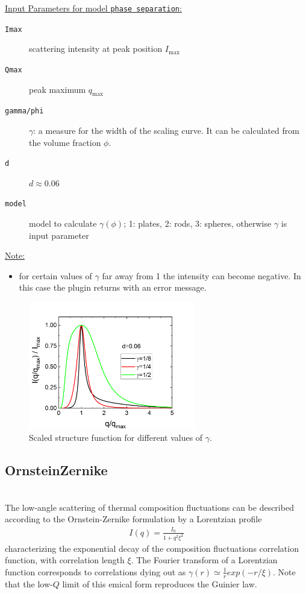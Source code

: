 \vspace{5mm}

\underline{Input Parameters for model \texttt{phase separation}:}\\
\begin{description}
\item[\texttt{Imax}] scattering intensity at peak position $I_\text{max}$
\item[\texttt{Qmax}] peak maximum $q_\text{max}$
\item[\texttt{gamma/phi}] $\gamma$: a measure for the width of the scaling curve. It can be calculated from the volume fraction $\phi$.
\item[\texttt{d}] $d \approx 0.06$
\item[\texttt{model}] model to calculate $\gamma(\phi)$; 1: plates, 2: rods, 3: spheres, otherwise $\gamma$ is input parameter
\end{description}

\underline{Note:}
\begin{itemize}
\item for certain values of $\gamma$ far away from 1 the intensity can become negative. In this case the plugin returns with an error message.
\end{itemize}



\begin{figure}[htb]
\begin{center}
\includegraphics[width=0.65\textwidth]{../images/form_factor/nonparticular/phase_separation.png}
\end{center}
\caption{Scaled structure function for different values of $\gamma$.} \label{fig:phaseseparationIQ}
\end{figure}

\clearpage
\subsection{OrnsteinZernike}
\label{sect:Zernike}
 ~\\
The low-angle scattering of thermal composition fluctuations can be
described according to the Ornstein-Zernike formulation by a
Lorentzian profile
\begin{align}
I(q) = \frac{I_0}{1+q^2\xi^2}
\end{align}
characterizing the exponential decay of the composition fluctuations
correlation function, with correlation length $\xi$. The Fourier
transform of a Lorentzian function corresponds to correlations dying
out as $\gamma(r) \simeq \frac{1}{r}exp(-r/\xi)$. Note that the
low-$Q$ limit of this emical form reproduces the Guinier law.

